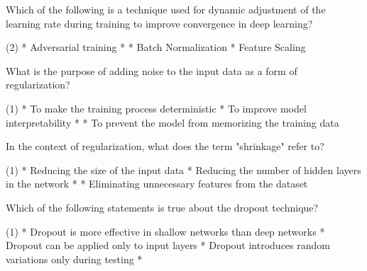 \documentclass[10pt]{extarticle}
\begin{document}
\begin{exercise}
    Which of the following is a technique used for dynamic adjustment of the learning rate during training to improve convergence in deep learning?
    \begin{choice}(2)
        * Adversarial training
        * 
        * Batch Normalization
        * Feature Scaling
    \end{choice}
\end{exercise}
\begin{solution}
\end{solution}

\begin{exercise}
    What is the purpose of adding noise to the input data as a form of regularization?
    \begin{choice} (1)
        * To make the training process deterministic
        * To improve model interpretability
        * 
        * To prevent the model from memorizing the training data
    \end{choice}
\end{exercise}
\begin{solution}
\end{solution}

\begin{exercise}
    In the context of regularization, what does the term "shrinkage" refer to?
    \begin{choice} (1)
        * Reducing the size of the input data
        * Reducing the number of hidden layers in the network
        * 
        * Eliminating unnecessary features from the dataset
    \end{choice}
\end{exercise}
\begin{solution}
\end{solution}

\begin{exercise}
    Which of the following statements is true about the dropout technique?
    \begin{choice} (1)
        * Dropout is more effective in shallow networks than deep networks
        * Dropout can be applied only to input layers
        * Dropout introduces random variations only during testing
        * 
    \end{choice}
\end{exercise}
\begin{solution}
\end{solution}
\end{document}
